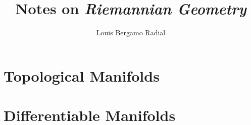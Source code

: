 \documentclass[12pt,oneside,a4paper]{book}
\title{Notes on \textit{Riemannian Geometry}}
\author{Louis Bergamo Radial}
\numberwithin{equation}{section}
\begin{document}
\maketitle

\tableofcontents

\chapter{Topological Manifolds}


\chapter{Differentiable Manifolds}


\printbibliography
\end{document}
